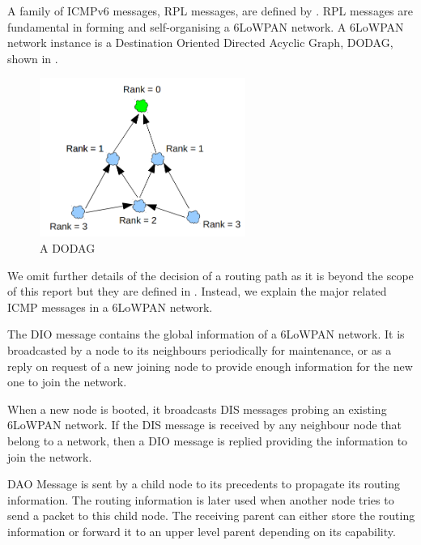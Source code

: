 A family of ICMPv6 messages, RPL messages, are defined by \cite{rfc6550}. RPL messages are fundamental in forming and self-organising a 6LoWPAN network. A 6LoWPAN network instance is a Destination Oriented Directed Acyclic Graph, DODAG, shown in . 
\begin{figure}[h!]
	\center
	\includegraphics[width=0.6\textwidth]{fig/dodag.png}
	\caption{A DODAG}
	\label{Fig: DODAG}
\end{figure}
We omit further details of the decision of a routing path as it is beyond the scope of this report but they are defined in \cite{rfc6550}. Instead, we explain the major related ICMP messages in a 6LoWPAN network.
\begin{description}[style=nextline]
\item[\textbf{DAG Information Object (DIO) Message}]
The DIO message contains the global information of a 6LoWPAN network. It is broadcasted by a node to its neighbours periodically for maintenance, or as a reply on request of a new joining node to provide enough information for the new one to join the network.

\item[\textbf{DAG Information Solicitation (DIS) Message}]
When a new node is booted, it broadcasts DIS messages probing an existing 6LoWPAN network. If the DIS message is received by any neighbour node that belong to a network, then a DIO message is replied providing the information to join the network.

\item[\textbf{Destination Advertisement Object (DAO) Message}]
DAO Message is sent by a child node to its precedents to propagate its routing information. The routing information is later used when another node tries to send a packet to this child node. The receiving parent can either store the routing information or forward it to an upper level parent depending on its capability.
\end{description}

